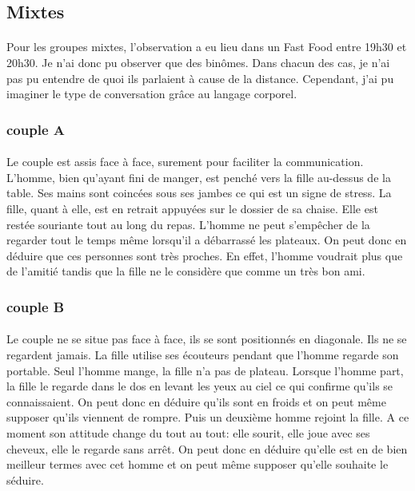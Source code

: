 \subsection{Mixtes}

\paragraph{} Pour les groupes mixtes, l'observation a eu lieu dans un Fast Food
entre 19h30 et 20h30. Je n'ai donc pu observer que des binômes. Dans chacun des
cas, je n'ai pas pu entendre de quoi ils parlaient à cause de la distance.
Cependant, j'ai pu imaginer le type de conversation grâce au langage corporel.

\subsubsection{couple A}

\paragraph{} Le couple est assis face à face, surement pour faciliter la
communication. L'homme, bien qu'ayant fini de manger, est penché vers la fille
au-dessus de la table. Ses mains sont coincées sous ses jambes ce qui est un
signe de stress. La fille, quant à elle, est en retrait appuyées sur le dossier
de sa chaise. Elle est restée souriante tout au long du repas. L'homme ne peut
s'empêcher de la regarder tout le temps même lorsqu'il a débarrassé les
plateaux. On peut donc en déduire que ces personnes sont très proches. En
effet, l'homme voudrait plus que de l'amitié tandis que la fille ne le
considère que comme un très bon ami.

\subsubsection{couple B}

\paragraph{} Le couple ne se situe pas face à face, ils se sont positionnés en
diagonale. Ils ne se regardent jamais. La fille utilise ses écouteurs pendant
que l'homme regarde son portable. Seul l'homme mange, la fille n'a pas de
plateau. Lorsque l'homme part, la fille le regarde dans le dos en levant les
yeux au ciel ce qui confirme qu'ils se connaissaient. On peut donc en déduire
qu'ils sont en froids et on peut même supposer qu'ils viennent de rompre. Puis
un deuxième homme rejoint la fille. A ce moment son attitude change du tout au
tout: elle sourit, elle joue avec ses cheveux, elle le regarde sans arrêt. On
peut donc en déduire qu'elle est en de bien meilleur termes avec cet homme et
on peut même supposer qu'elle souhaite le séduire.

